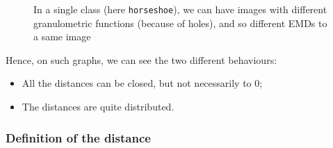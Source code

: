 \begin{figure}[!ht]
    \centering
    \caption{In a single class (here \texttt{horseshoe}), we can have images with different granulometric functions (because of holes), and so different EMDs to a same image} 
	\label{horseshoes}
\end{figure}

Hence, on such graphs, we can see the two different behaviours: 
\begin{itemize}
	\item All the distances can be closed, but not necessarily to 0;
	\item The distances are quite distributed.
\end{itemize}

\subsubsection{Definition of the distance}

